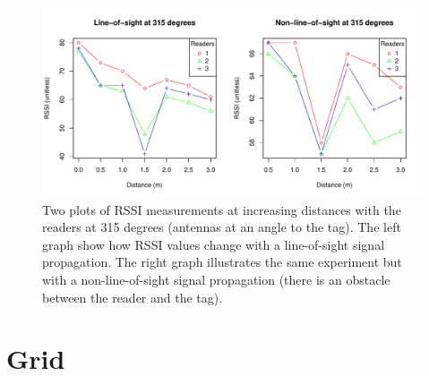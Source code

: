 \begin{figure}[H]
	\begin{center}
		\includegraphics[width=1\textwidth]{figures/rssi_distance_3m_315deg}
		\caption{Two plots of RSSI measurements at increasing distances with the readers at 315 degrees (antennas at an angle to the tag). The left graph show how RSSI values change with a line-of-sight signal propagation. The right graph illustrates the same experiment but with a non-line-of-sight signal propagation (there is an obstacle between the reader and the tag).}
	\end{center}
\end{figure}

\newpage
\section{Grid}

